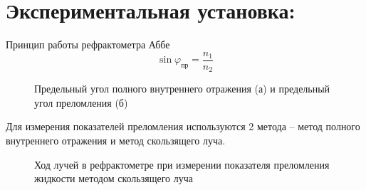 \documentclass[12pt]{article}
\begin{document}
\section*{Экспериментальная установка:}
Принцип работы рефрактометра Аббе
    \[ \sin{\varphi_{\text{пр}}} = \frac{n_1}{n_2} \]
    
    \begin{figure}[h!]
        \noindent{}
        \caption{Предельный угол полного внутреннего отражения (а) и предельный угол преломления (б)}
    \end{figure}   
    
    Для измерения показателей преломления используются 2 метода – метод полного внутреннего отражения и метод скользящего луча.
    
    \begin{figure}[h!]
        \noindent{}
        \caption{Ход лучей в рефрактометре при измерении показателя преломления жидкости методом скользящего луча}
    \end{figure} 
    
\end{document}
